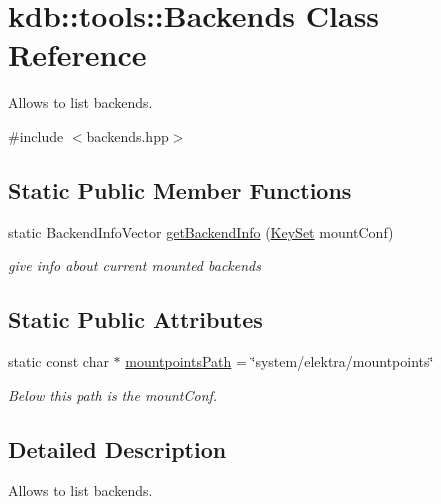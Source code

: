 \hypertarget{classkdb_1_1tools_1_1Backends}{\section{kdb\-:\-:tools\-:\-:Backends Class Reference}
\label{classkdb_1_1tools_1_1Backends}
}


Allows to list backends.  




{\ttfamily \#include $<$backends.\-hpp$>$}

\subsection*{Static Public Member Functions}
\begin{DoxyCompactItemize}
\item 
static Backend\-Info\-Vector \hyperlink{classkdb_1_1tools_1_1Backends_a82b334d8a1e01df664462c6dd43bd7e1}{get\-Backend\-Info} (\hyperlink{classkdb_1_1KeySet}{Key\-Set} mount\-Conf)
\begin{DoxyCompactList}\small\item\em give info about current mounted backends \end{DoxyCompactList}\end{DoxyCompactItemize}
\subsection*{Static Public Attributes}
\begin{DoxyCompactItemize}
\item 
\hypertarget{classkdb_1_1tools_1_1Backends_ac867850accaab4fda286f763cacc3926}{static const char $\ast$ \hyperlink{classkdb_1_1tools_1_1Backends_ac867850accaab4fda286f763cacc3926}{mountpoints\-Path} = \char`\"{}system/elektra/mountpoints\char`\"{}}\label{classkdb_1_1tools_1_1Backends_ac867850accaab4fda286f763cacc3926}

\begin{DoxyCompactList}\small\item\em Below this path is the mount\-Conf. \end{DoxyCompactList}\end{DoxyCompactItemize}


\subsection{Detailed Description}
Allows to list backends. 

